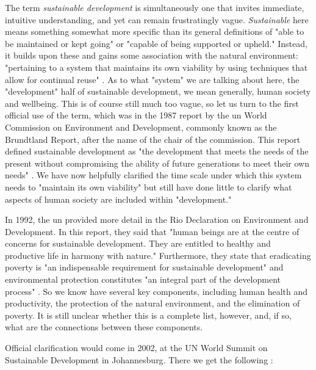 The term \textit{sustainable development} is simultaneously one that invites immediate, intuitive understanding, and yet can remain frustratingly vague. \textit{Sustainable} here means something somewhat more specific than its general definitions of "able to be maintained or kept going" or "capable of being supported or upheld." Instead, it builds upon these and gains some association with the natural environment: "pertaining to a system that maintains its own viability by using techniques that allow for continual reuse" \cite{DefinitionSustainableDictionary}. As to what "system" we are talking about here, the "development" half of sustainable development, we mean generally, human society and wellbeing. This is of course still much too vague, so let us turn to the first official use of the term, which was in the 1987 report by the \ac{un} World Commission on Environment and Development, commonly known as the Brundtland Report, after the name of the chair of the commission. This report defined sustainable development as "the development that meets the needs of the present without compromising the ability of future generations to meet their own needs" \cite{worldcommissiononenvironmentanddevelopmentOurCommonFuture}. We have now helpfully clarified the time scale under which this system needs to "maintain its own viability" but still have done little to clarify what aspects of human society are included within "development." 

In 1992, the \ac{un} provided more detail in the Rio Declaration on Environment and Development. In this report, they said that "human beings are at the centre of concerns for sustainable development. They are entitled to healthy and productive life in harmony with nature." Furthermore, they state that eradicating poverty is "an indispensable requirement for sustainable development" and environmental protection constitutes "an integral part of the development process" \cite{unitednationsconferenceonenvironmentanddevelopmentRioDeclarationEnvironment1992}. So we know have several key components, including human health and productivity, the protection of the natural environment, and the elimination of poverty. It is still unclear whether this is a complete list, however, and, if so, what are the connections between these components.

Official clarification would come in 2002, at the UN World Summit on Sustainable Development in Johannesburg. There we get the following \cite{worldsummitonsustainabledevelopmentPlanImplementationWorld2002}:

